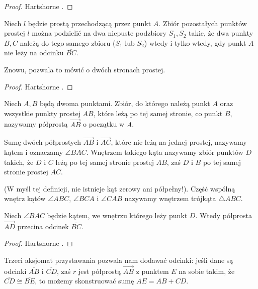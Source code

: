 {\begin{proof}
	Hartshorne \cite[s. 74--76]{hartshorne_2010}.
\end{proof}

\begin{proposition}
	Niech $l$ będzie prostą przechodzącą przez punkt $A$.
	Zbiór pozostałych punktów prostej $l$ można podzielić na dwa niepuste podzbiory $S_1, S_2$ takie, że dwa punkty $B, C$ należą do tego samego zbioru ($S_1$ lub $S_2$) wtedy i tylko wtedy, gdy punkt $A$ nie leży na odcinku $\overline{BC}$.
\end{proposition}

Znowu, pozwala to mówić o dwóch stronach prostej.

\begin{proof}
	Hartshorne \cite[s. 76--77]{hartshorne_2010}.
\end{proof}

\begin{definition}[półprosta]
	Niech $A, B$ będą dwoma punktami.
	Zbiór, do którego należą punkt $A$ oraz wszystkie punkty prostej $AB$, które leżą po tej samej stronie, co punkt $B$, nazywamy półprostą $\overrightarrow{AB}$ o początku w $A$.
\end{definition}

\begin{definition}[kąt]
	Sumę dwóch półprostych $\overrightarrow{AB}$ i $\overrightarrow{AC}$, które nie leżą na jednej prostej, nazywamy kątem i oznaczamy $\angle BAC$.
	Wnętrzem takiego kąta nazywamy zbiór punktów $D$ takich, że $D$ i $C$ leżą po tej samej stronie prostej $AB$, zaś $D$ i $B$ po tej samej stronie prostej $AC$.
\end{definition}

(W myśl tej definicji, nie istnieje kąt zerowy ani półpełny!).
Część wspólną wnętrz kątów $\angle ABC$, $\angle BCA$ i $\angle CAB$ nazywamy wnętrzem trójkąta $\triangle ABC$.

\begin{proposition}[o kuszy]
	Niech $\angle BAC$ będzie kątem, we wnętrzu którego leży punkt $D$.
	Wtedy półprosta $\overrightarrow{AD}$ przecina odcinek $\overline{BC}$.
\end{proposition}

\begin{proof}
	Hartshorne \cite[s. 77--78]{hartshorne_2010}.
\end{proof}

Trzeci aksjomat przystawania pozwala nam dodawać odcinki: jeśli dane są odcinki $\overline{AB}$ i $\overline{CD}$, zaś $r$ jest półprostą $\overrightarrow{AB}$ z punktem $E$ na sobie takim, że $\overline{CD} \cong \overline{BE}$, to możemy skonstruować sumę $AE = AB + CD$.

}
